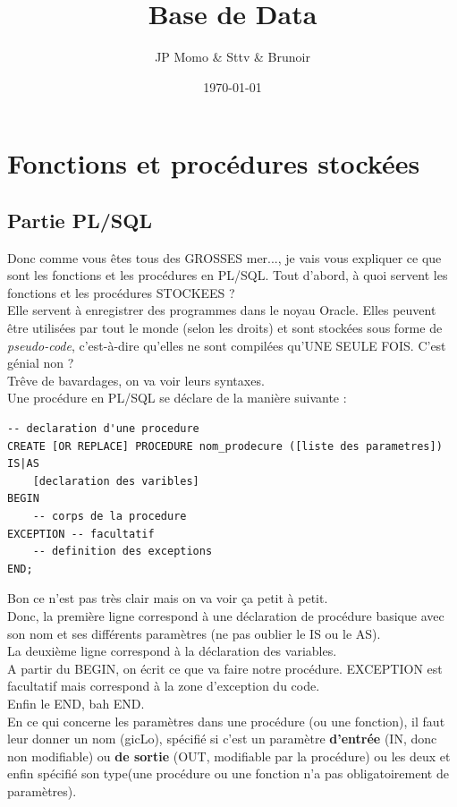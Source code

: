 \documentclass{report}
\title{Base de Data}
\author{JP Momo \& Sttv \& Brunoir}
\date{\today}
\begin{document}
\maketitle{}

\chapter{Fonctions et procédures stockées}
\section{Partie PL/SQL}
Donc comme vous êtes tous des GROSSES mer..., je vais vous expliquer ce que sont les fonctions et les procédures en PL/SQL.
Tout d'abord, à quoi servent les fonctions et les procédures STOCKEES ?\\
Elle servent à enregistrer des programmes dans le noyau Oracle. Elles peuvent être utilisées par tout le monde (selon les droits) et sont stockées sous forme de \textit{pseudo-code}, c'est-à-dire qu'elles ne sont compilées qu'UNE SEULE FOIS. C'est génial non ?\\
Trêve de bavardages, on va voir leurs syntaxes.\\
Une procédure en PL/SQL se déclare de la manière suivante :
\begin{lstlisting}[style=MySQLStyle]
-- declaration d'une procedure
CREATE [OR REPLACE] PROCEDURE nom_prodecure ([liste des parametres]) IS|AS
	[declaration des varibles]
BEGIN
	-- corps de la procedure
EXCEPTION -- facultatif
	-- definition des exceptions
END;
\end{lstlisting}

Bon ce n'est pas très clair mais on va voir ça petit à petit.\\
Donc, la première ligne correspond à une déclaration de procédure basique avec son nom et ses différents paramètres (ne pas oublier le IS ou le AS).\\
La deuxième ligne correspond à la déclaration des variables. \\A partir du BEGIN, on écrit ce que va faire notre procédure. EXCEPTION est facultatif mais correspond à la zone d'exception du code. \\Enfin le END, bah END.\\
En ce qui concerne les paramètres dans une procédure (ou une fonction), il faut leur donner un nom (gicLo), spécifié si c'est un paramètre \textbf{d'entrée} (IN, donc non modifiable) ou \textbf{de sortie} (OUT, modifiable par la procédure) ou les deux et enfin spécifié son type(une procédure ou une fonction n'a pas obligatoirement de paramètres).\\
\end{document}
